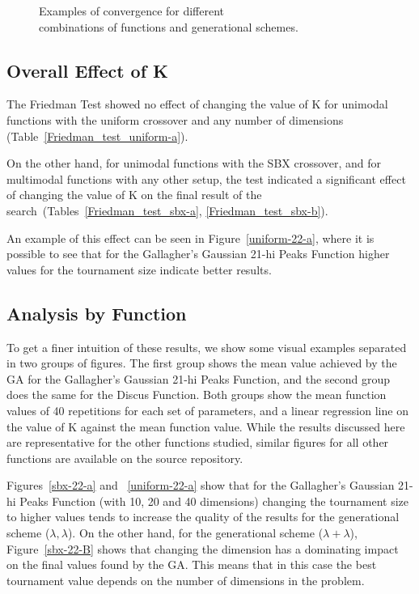 \begin{figure}[!t]
	\caption{Examples of convergence for different \\combinations of functions and generational schemes.}
		\raggedright
\end{figure}



\subsection{Overall Effect of K}

The Friedman Test showed no effect of changing the value of K
for unimodal functions with the uniform crossover and any
number of dimensions (Table~\ref{Friedman_test_uniform-a}). 

On the other hand, for unimodal functions with the SBX crossover, and
for multimodal functions with any other setup, the test indicated a
significant effect of changing the value of K on the final result of
the search~(Tables~\ref{Friedman_test_sbx-a}, \ref{Friedman_test_sbx-b}). 

An example of this effect can be seen in Figure~\ref{uniform-22-a},
where it is possible to see that for the Gallagher's Gaussian 21-hi
Peaks Function higher values for the tournament size indicate better
results.

\subsection{Analysis by Function}

To get a finer intuition of these results, we show some visual
examples separated in two groups of figures. The first group shows the
mean value achieved by the GA for the Gallagher's Gaussian 21-hi Peaks
Function, and the second group does the same for the Discus
Function. Both groups show the mean function values of 40 repetitions
for each set of parameters, and a linear regression line on the value
of K against the mean function value. While the results discussed here
are representative for the other functions studied, similar figures
for all other functions are available on the source repository.

Figures~\ref{sbx-22-a} and ~\ref{uniform-22-a} show that for the
Gallagher's Gaussian 21-hi Peaks Function (with 10, 20 and 40
dimensions) changing the tournament size to higher values tends to
increase the quality of the results for the generational scheme
($\lambda, \lambda$). On the other hand, for the generational scheme
($\lambda + \lambda$), Figure~\ref{sbx-22-B} shows that changing the
dimension has a dominating impact on the final values found by the
GA. This means that in this case the best tournament value depends on
the number of dimensions in the problem.

